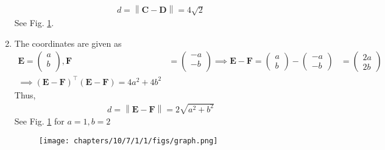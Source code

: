 \documentclass[12pt]{article}
\providecommand{\norm}[1]{\left\lVert#1\right\rVert}
\newcommand{\myvec}[1]{\ensuremath{\begin{pmatrix}#1\end{pmatrix}}}
\let\vec\mathbf
\begin{document}
\begin{enumerate}
\begin{align}
		d=\norm{\vec{C}-\vec{D}}
 =4\sqrt{2}
\end{align}	
	See Fig. \ref{fig:10/7/1/1Fig}.
%	
\item The coordinates are given as
	\begin{align}
	\vec{E} = \myvec{
		a\\
		b\\
		},
		\vec{F} &= \myvec{
		-a\\
		-b\\
		}
		\implies		\vec{E} - \vec{F} = \myvec{a\\b} - \myvec{-a\\-b} &= \myvec{2a\\2b}		
		\\
		\implies
		(\vec{E}-\vec{F})^\top (\vec{E}-\vec{F}) = 4a^2+4b^2 
	\end{align}
Thus,	
	\begin{align}
		d=\norm{\vec{E}-\vec{F}} =
2\sqrt{a^2+b^2}
\end{align}	
See  
Fig. \ref{fig:10/7/1/1Fig} for 
$ a=1,b=2$ 
\begin{figure}[H]
	\begin{center} 
	    \texttt{[image: chapters/10/7/1/1/figs/graph.png]}
	\end{center}
\caption{}
\label{fig:10/7/1/1Fig}
\end{figure}
\end{enumerate}
\end{document}
